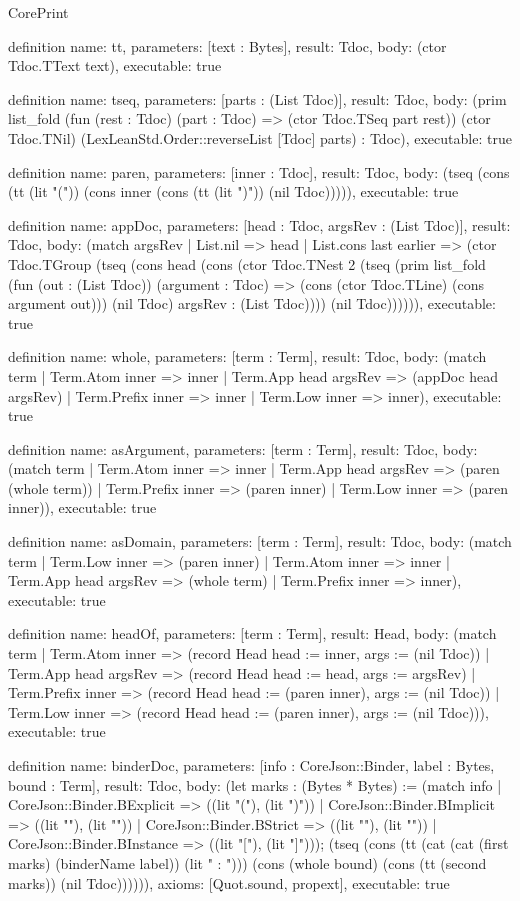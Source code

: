 \begin{lexlean}{CorePrint}
\begin{semanticmodule}
definition{
  name: tt,
  parameters: [text : Bytes],
  result: Tdoc,
  body: (ctor Tdoc.TText text),
  executable: true
}

definition{
  name: tseq,
  parameters: [parts : (List Tdoc)],
  result: Tdoc,
  body: (prim list_fold (fun (rest : Tdoc) (part : Tdoc) => (ctor Tdoc.TSeq part rest)) (ctor Tdoc.TNil) (LexLeanStd.Order::reverseList [Tdoc] parts) : Tdoc),
  executable: true
}

definition{
  name: paren,
  parameters: [inner : Tdoc],
  result: Tdoc,
  body: (tseq (cons (tt (lit "(")) (cons inner (cons (tt (lit ")")) (nil Tdoc))))),
  executable: true
}

definition{
  name: appDoc,
  parameters: [head : Tdoc, argsRev : (List Tdoc)],
  result: Tdoc,
  body: (match argsRev
    | List.nil => head
    | List.cons last earlier => (ctor Tdoc.TGroup (tseq (cons head (cons (ctor Tdoc.TNest 2 (tseq (prim list_fold (fun (out : (List Tdoc)) (argument : Tdoc) => (cons (ctor Tdoc.TLine) (cons argument out))) (nil Tdoc) argsRev : (List Tdoc)))) (nil Tdoc)))))),
  executable: true
}

definition{
  name: whole,
  parameters: [term : Term],
  result: Tdoc,
  body: (match term
    | Term.Atom inner => inner
    | Term.App head argsRev => (appDoc head argsRev)
    | Term.Prefix inner => inner
    | Term.Low inner => inner),
  executable: true
}

definition{
  name: asArgument,
  parameters: [term : Term],
  result: Tdoc,
  body: (match term
    | Term.Atom inner => inner
    | Term.App head argsRev => (paren (whole term))
    | Term.Prefix inner => (paren inner)
    | Term.Low inner => (paren inner)),
  executable: true
}

definition{
  name: asDomain,
  parameters: [term : Term],
  result: Tdoc,
  body: (match term
    | Term.Low inner => (paren inner)
    | Term.Atom inner => inner
    | Term.App head argsRev => (whole term)
    | Term.Prefix inner => inner),
  executable: true
}

definition{
  name: headOf,
  parameters: [term : Term],
  result: Head,
  body: (match term
    | Term.Atom inner => (record Head {head := inner, args := (nil Tdoc)})
    | Term.App head argsRev => (record Head {head := head, args := argsRev})
    | Term.Prefix inner => (record Head {head := (paren inner), args := (nil Tdoc)})
    | Term.Low inner => (record Head {head := (paren inner), args := (nil Tdoc)})),
  executable: true
}

definition{
  name: binderDoc,
  parameters: [info : CoreJson::Binder, label : Bytes, bound : Term],
  result: Tdoc,
  body: (let marks : (Bytes * Bytes) := (match info
    | CoreJson::Binder.BExplicit => ((lit "("), (lit ")"))
    | CoreJson::Binder.BImplicit => ((lit "{"), (lit "}"))
    | CoreJson::Binder.BStrict => ((lit "{{"), (lit "}}"))
    | CoreJson::Binder.BInstance => ((lit "["), (lit "]"))); (tseq (cons (tt (cat (cat (first marks) (binderName label)) (lit " : "))) (cons (whole bound) (cons (tt (second marks)) (nil Tdoc)))))),
  axioms: [Quot.sound, propext],
  executable: true
}


\end{semanticmodule}
\end{lexlean}
